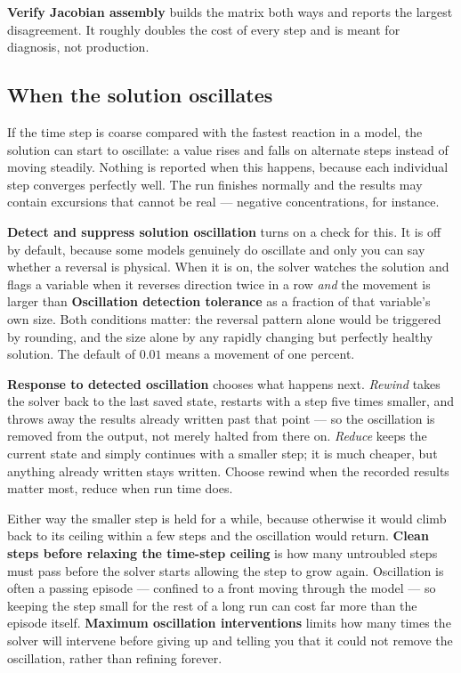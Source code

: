 \textbf{Verify Jacobian assembly} builds the matrix both ways and reports the
largest disagreement. It roughly doubles the cost of every step and is meant for
diagnosis, not production.

\subsection{When the solution oscillates}

If the time step is coarse compared with the fastest reaction in a model, the
solution can start to oscillate: a value rises and falls on alternate steps
instead of moving steadily. Nothing is reported when this happens, because each
individual step converges perfectly well. The run finishes normally and the
results may contain excursions that cannot be real --- negative concentrations,
for instance.

\textbf{Detect and suppress solution oscillation} turns on a check for this.
It is off by default, because some models genuinely do oscillate and only you
can say whether a reversal is physical. When it is on, the solver watches the
solution and flags a variable when it reverses direction twice in a row
\emph{and} the movement is larger than \textbf{Oscillation detection tolerance}
as a fraction of that variable's own size. Both conditions matter: the reversal
pattern alone would be triggered by rounding, and the size alone by any rapidly
changing but perfectly healthy solution. The default of $0.01$ means a movement
of one percent.

\textbf{Response to detected oscillation} chooses what happens next.
\emph{Rewind} takes the solver back to the last saved state, restarts with a
step five times smaller, and throws away the results already written past that
point --- so the oscillation is removed from the output, not merely halted from
there on. \emph{Reduce} keeps the current state and simply continues with a
smaller step; it is much cheaper, but anything already written stays written.
Choose rewind when the recorded results matter most, reduce when run time does.

Either way the smaller step is held for a while, because otherwise it would
climb back to its ceiling within a few steps and the oscillation would return.
\textbf{Clean steps before relaxing the time-step ceiling} is how many
untroubled steps must pass before the solver starts allowing the step to grow
again. Oscillation is often a passing episode --- confined to a front moving
through the model --- so keeping the step small for the rest of a long run can
cost far more than the episode itself. \textbf{Maximum oscillation
interventions} limits how many times the solver will intervene before giving up
and telling you that it could not remove the oscillation, rather than refining
forever.

